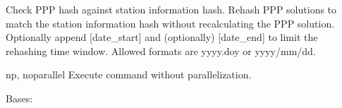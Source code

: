 \documentclass[letterpaper,10pt,english]{sphinxmanual}
\begin{document}
\begin{description}
\begin{description}
\sphinxAtStartPar
Check PPP hash against station information hash.
Rehash PPP solutions to match the station information
hash without recalculating the PPP solution.
Optionally append {[}date\_start{]} and (optionally)
{[}date\_end{]} to limit the rehashing time window. Allowed
formats are yyyy.doy or yyyy/mm/dd.

\end{description}
\begin{optionlist}{3cm}
\item [\sphinxhyphen{}np, \sphinxhyphen{}\sphinxhyphen{}noparallel]  
\sphinxAtStartPar
Execute command without parallelization.
\end{optionlist}

\end{description}

\begin{fulllineitems}
\label{\detokenize{pgamit.com:pgamit.com.ScanArchive.Encoder}}
\pysigstartsignatures
\pysiglinewithargsret
{}
{\sphinxparamcomma {}\sphinxparamcomma {}\sphinxparamcomma {}\sphinxparamcomma {}\sphinxparamcomma {}\sphinxparamcomma {}\sphinxparamcomma {}\sphinxparamcomma {}}
{}
\pysigstopsignatures
\sphinxAtStartPar
Bases: 

\begin{fulllineitems}
\label{\detokenize{pgamit.com:pgamit.com.ScanArchive.Encoder.default}}
\pysigstartsignatures
\pysiglinewithargsret
{}
{}
{}
\pysigstopsignatures
\end{fulllineitems}


\end{fulllineitems}
\end{document}
